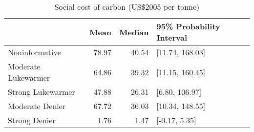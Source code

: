 \begin{table}[t]
\centering
\caption{Social cost of carbon (US\$2005 per tonne)} 
\label{tab:scc}
\begin{tabular}{lrrl}
  \toprule
 & Mean & Median & 95\% Probability Interval \\ 
  \midrule
Noninformative & 78.97 & 40.54 & [11.74, 168.03] \\ 
  Moderate Lukewarmer & 64.86 & 39.32 & [11.15, 160.45] \\ 
  Strong Lukewarmer & 47.88 & 26.31 & [6.80, 106.97] \\ 
  Moderate Denier & 67.72 & 36.03 & [10.34, 148.55] \\ 
  Strong Denier & 1.76 & 1.47 & [-0.17, 5.35] \\ 
   \bottomrule
\end{tabular}
\end{table}
